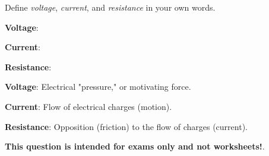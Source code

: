 

Define {\it voltage}, {\it current}, and {\it resistance} in your own words.

\vskip 10pt

{\bf Voltage}:

\vskip 10pt

{\bf Current}:

\vskip 10pt

{\bf Resistance}:







{\bf Voltage}: Electrical "pressure," or motivating force.

\vskip 10pt

{\bf Current}: Flow of electrical charges (motion).

\vskip 10pt

{\bf Resistance}: Opposition (friction) to the flow of charges (current).







{\bf This question is intended for exams only and not worksheets!}.



